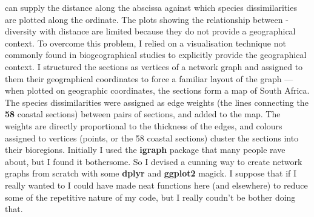 \documentclass[10pt,A4,]{article}
\begin{document}
can supply the distance along the abscissa against which species
dissimilarities are plotted along the ordinate. The plots showing the
relationship between \textbeta-diversity with distance are limited
because they do not provide a geographical context. To overcome this
problem, I relied on a visualisation technique not commonly found in
biogeographical studies to explicitly provide the geographical context.
I structured the sections as vertices of a network graph and assigned to
them their geographical coordinates to force a familiar layout of the
graph --- when plotted on geographic coordinates, the sections form a
map of South Africa. The species dissimilarities were assigned as edge
weights (the lines connecting the \textbf{58} coastal sections) between
pairs of sections, and added to the map. The weights are directly
proportional to the thickness of the edges, and colours assigned to
vertices (points, or the 58 coastal sections) cluster the sections into
their bioregions. Initially I used the \textbf{igraph} package that many
people rave about, but I found it bothersome. So I devised a cunning way
to create network graphs from scratch with some \textbf{dplyr} and
\textbf{ggplot2} magick. I suppose that if I really wanted to I could
have made neat functions here (and elsewhere) to reduce some of the
repetitive nature of my code, but I really coudn't be bother doing that.
\end{document}
